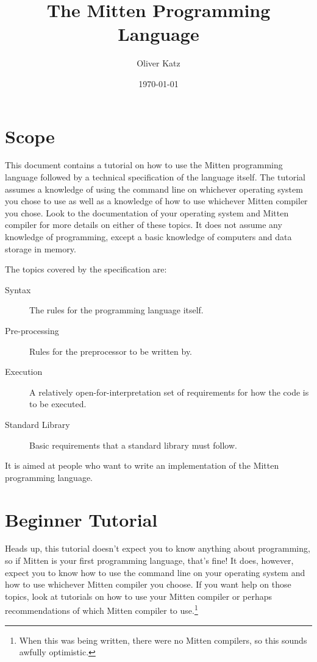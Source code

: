 \documentclass[10pt,a4paper]{article}
\title{The Mitten Programming Language}
\author{Oliver Katz}
\date{\today}
\begin{document}
\maketitle
\tableofcontents
\newpage




\section{Scope}
This document contains a tutorial on how to use the Mitten programming language followed by a technical specification of the language itself. The tutorial assumes a knowledge of using the command line on whichever operating system you chose to use as well as a knowledge of how to use whichever Mitten compiler you chose. Look to the documentation of your operating system and Mitten compiler for more details on either of these topics. It does not assume any knowledge of programming, except a basic knowledge of computers and data storage in memory.

The topics covered by the specification are:
\begin{description}
  \item[Syntax] The rules for the programming language itself.
  \item[Pre-processing] Rules for the preprocessor to be written by.
  \item[Execution] A relatively open-for-interpretation set of requirements for how the code is to be executed.
  \item[Standard Library] Basic requirements that a standard library must follow.
\end{description}

It is aimed at people who want to write an implementation of the Mitten programming language.

\newpage

\section{Beginner Tutorial}
Heads up, this tutorial doesn't expect you to know anything about programming, so if Mitten is your first programming language, that's fine! It does, however, expect you to know how to use the command line on your operating system and how to use whichever Mitten compiler you choose. If you want help on those topics, look at tutorials on how to use your Mitten compiler or perhaps recommendations of which Mitten compiler to use.\footnote{When this was being written, there were no Mitten compilers, so this sounds awfully optimistic.}
\end{document}
